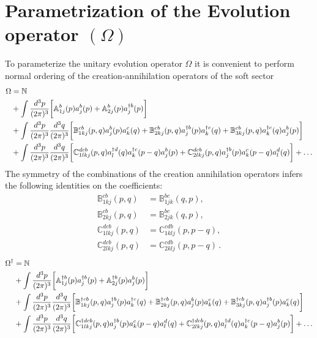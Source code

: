 \documentclass[aps,prd,amsmath,amssymb,nofootinbib]{revtex4-2}
\def\mf#1{\mathbb{#1}}
\numberwithin{equation}{section}
\begin{document}
\section{Parametrization of the Evolution operator $(\Omega)$}
To parameterize the unitary evolution operator $\Omega$ it is convenient to perform normal ordering of the creation-annihilation operators of the soft sector  
\begin{align}\label{Eq:OmegaExp}
    \Omega  & = \mf{N} \notag \\ & +
                \int \frac{d^3p}{(2\pi)^3} 
                \bigg[ 
                   \mf{A}^{b}_{1j}(p)a^{b}_{j}(p) 
                +  \mf{A}^{b}_{2j} (p) a^{\dagger b}_{j}(p)\bigg] \notag \\ & 
               +\int \frac{d^3p}{(2\pi)^3} \frac{d^3q}{(2\pi)^3} 
               \bigg[\mf{B}^{cb}_{1kj}(p,q) a^{b}_{j}(p)a^{c}_{k}(q) 
                   + \mf{B}^{cb}_{2kj}(p,q) a^{\dagger b}_{j}(p)a^{\dagger c}_{k}(q)
               + \mf{B}^{cb}_{3kj} (p,q) a^{\dagger c}_{k}(q)a^{b}_{j}(p)
               \bigg] \notag \\ & 
               + \int 
               \frac{d^3p}{(2\pi)^3} \frac{d^3q}{(2\pi)^3} 
               \bigg[
                \mf{C}^{ dcb}_{1lkj}(p,q) a^{\dagger d}_{l}(q)  a^{\dagger c}_{k}(p-q)  a^{b}_{j}(p)
               + \mf{C}^{dcb}_{2lkj}(p,q) a^{\dagger b}_{j}(p) a^{c}_{k}(p-q) a^{d}_{l}(q)\bigg] +\ldots
\end{align}
The symmetry of the combinations of the creation annihilation operators infers the following identities on the coefficients: 
\begin{align}
    \mf{B}^{cb}_{1kj}(p,q) &= \mf{B}^{bc}_{1jk}(q,p), \\   
    \mf{B}^{cb}_{2kj}(p,q) &= \mf{B}^{bc}_{2jk}(q,p),  \\ 
    \mf{C}^{ dcb}_{1lkj}(p,q) & = \mf{C}^{ cdb}_{1klj}(p,p-q), \\  
    \mf{C}^{ dcb}_{2lkj}(p,q) & = \mf{C}^{ cdb}_{2klj}(p,p-q)\,.   
\end{align}
\begin{align}
    \Omega^{\dagger}  & = \mf{N} \notag \\ & +
                \int \frac{d^3p}{(2\pi)^3} 
                \bigg[ 
                   \mf{A}^{\dagger b}_{1j}(p)a^{\dagger b}_{j}(p) 
                +  \mf{A}^{\dagger b}_{2j} (p) a^{b}_{j}(p)\bigg] \notag \\ & 
               +\int \frac{d^3p}{(2\pi)^3} \frac{d^3q}{(2\pi)^3} 
               \bigg[\mf{B}^{\dagger cb}_{1kj}(p,q) a^{\dagger b}_{j}(p)a^{\dagger c}_{k}(q) 
                   + \mf{B}^{\dagger cb}_{2kj}(p,q) a^{b}_{j}(p)a^{c}_{k}(q)
               + \mf{B}^{\dagger cb}_{3kj} (p,q) a^{\dagger b}_{j}(p)a^{c}_{k}(q)
               \bigg] \notag \\ & 
               + \int 
               \frac{d^3p}{(2\pi)^3} \frac{d^3q}{(2\pi)^3} 
               \bigg[
                \mf{C}^{\dagger dcb}_{1lkj}(p,q) a^{\dagger b}_{j}(p) a^{c}_{k}(p-q)  a^{d}_{l}(q)
               + \mf{C}^{\dagger dcb}_{2lkj}(p,q) a^{\dagger d}_{l}(q) a^{\dagger c}_{k}(p-q)a^{b}_{j}(p) \bigg] +\ldots
\end{align}
\end{document}
